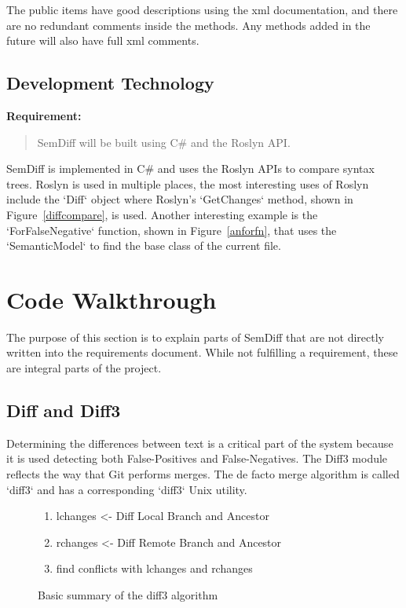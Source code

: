 \documentclass[draftclsnofoot,onecolumn]{IEEEtran}
\begin{document}
The public items have good descriptions using the xml documentation, and 
there are no redundant comments inside the methods. Any methods added in the 
future will also have full xml comments.






\subsection{Development Technology}

\textbf{Requirement:}

\begin{quote}

SemDiff will be built using C\# and the Roslyn API.

\end{quote}

SemDiff is implemented in C\# and uses the Roslyn APIs to compare syntax 
trees. Roslyn is used in multiple places, the most interesting uses of 
Roslyn include the `Diff` object where Roslyn’s `GetChanges` method, shown 
in Figure~\ref{diffcompare}, is used. Another interesting example is the 
`ForFalseNegative` function, shown in Figure~\ref{anforfn}, 
that uses the `SemanticModel` to find the base class of the current file.










\section{Code Walkthrough}

The purpose of this section is to explain parts of SemDiff that are not 
directly written into the requirements document. While not fulfilling a 
requirement, these are integral parts of the project.

\subsection{Diff and Diff3}

Determining the differences between text is a critical part of the system 
because it is used detecting both False-Positives and False-Negatives. The 
Diff3 module reflects the way that Git performs merges. The de facto merge 
algorithm is called `diff3` and has a corresponding `diff3` Unix utility. 

\begin{figure}[!t]
\centering
\begin{enumerate}
\item lchanges <- Diff Local Branch and Ancestor
\item rchanges <- Diff Remote Branch and Ancestor
\item find conflicts with lchanges and rchanges
\end{enumerate}
\caption{Basic summary of the diff3 algorithm}
\label{diff3algorithm}
\end{figure}
\end{document}
